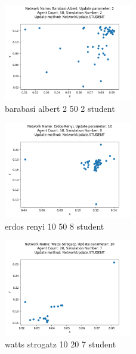 \begin{figure}
    \centering
    \includegraphics[width=0.5\textwidth]{img/barabasi_albert_2_50_2_student.png}
    \caption{barabasi albert 2 50 2 student}
    \label{fig:barabasi_albert_2_50_2_student}
\end{figure}

\begin{figure}
    \centering
    \includegraphics[width=0.5\textwidth]{img/erdos_renyi_10_50_8_student.png}
    \caption{erdos renyi 10 50 8 student}
    \label{fig:erdos_renyi_10_50_8_student}
\end{figure}

\begin{figure}
    \centering
    \includegraphics[width=0.5\textwidth]{img/watts_strogatz_10_20_7_student.png}
    \caption{watts strogatz 10 20 7 student}
    \label{fig:watts_strogatz_10_20_7_student}
\end{figure}